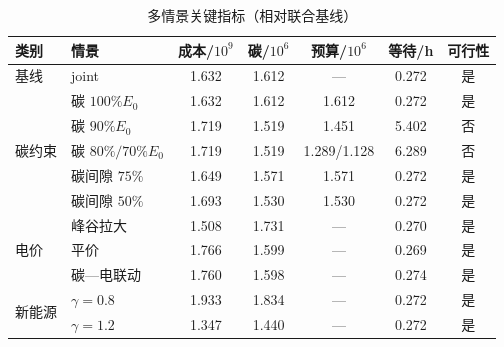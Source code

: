\begin{table}[htbp]
  \centering
  \caption{多情景关键指标（相对联合基线）}
  \label{tab:q4-scenarios}
  \small
  \setlength{\tabcolsep}{3.5pt}
  \begin{tabular}{llccccc}
    \hline
    类别 & 情景 & 成本/$10^9$ & 碳/$10^6$ & 预算/$10^6$ & 等待/h & 可行性 \\
    \hline
    基线 & joint & 1.632 & 1.612 & --- & 0.272 & 是 \\
    \hline
    \multirow{5}{*}{碳约束}
      & 碳 \(100\%E_0\) & 1.632 & 1.612 & 1.612 & 0.272 & 是 \\
      & 碳 \(90\%E_0\) & 1.719 & 1.519 & 1.451 & 5.402 & 否 \\
      & 碳 \(80\%/70\%E_0\) & 1.719 & 1.519 & 1.289/1.128 & 6.289 & 否 \\
      & 碳间隙 \(75\%\) & 1.649 & 1.571 & 1.571 & 0.272 & 是 \\
      & 碳间隙 \(50\%\) & 1.693 & 1.530 & 1.530 & 0.272 & 是 \\
    \hline
    \multirow{3}{*}{电价}
      & 峰谷拉大 & 1.508 & 1.731 & --- & 0.270 & 是 \\
      & 平价 & 1.766 & 1.599 & --- & 0.269 & 是 \\
      & 碳—电联动 & 1.760 & 1.598 & --- & 0.274 & 是 \\
    \hline
    \multirow{2}{*}{新能源}
      & \(\gamma=0.8\) & 1.933 & 1.834 & --- & 0.272 & 是 \\
      & \(\gamma=1.2\) & 1.347 & 1.440 & --- & 0.272 & 是 \\
    \hline
  \end{tabular}
\end{table}

